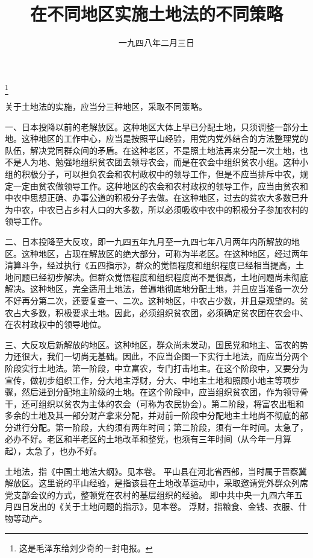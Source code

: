
\title{在不同地区实施土地法的不同策略}
\date{一九四八年二月三日}
\thanks{这是毛泽东给刘少奇的一封电报。}
\maketitle


关于土地法的实施，应当分三种地区，采取不同策略。

一、日本投降以前的老解放区。这种地区大体上早已分配土地，只须调整一部分土地。这种地区的工作中心，应当是按照平山经验，用党内党外结合的方法整理党的队伍，解决党同群众间的矛盾。在这种老区，不是照土地法再来分配一次土地，也不是人为地、勉强地组织贫农团去领导农会，而是在农会中组织贫农小组。这种小组的积极分子，可以担负农会和农村政权中的领导工作，但是不应当排斥中农，规定一定由贫农做领导工作。这种地区的农会和农村政权的领导工作，应当由贫农和中农中思想正确、办事公道的积极分子去做。在这种地区，过去的贫农大多数已升为中农，中农已占乡村人口的大多数，所以必须吸收中农中的积极分子参加农村的领导工作。

二、日本投降至大反攻，即一九四五年九月至一九四七年八月两年内所解放的地区。这种地区，占现在解放区的绝大部分，可称为半老区。在这种地区，经过两年清算斗争，经过执行《五四指示》，群众的觉悟程度和组织程度已经相当提高，土地问题已经初步解决。但群众觉悟程度和组织程度尚不是很高，土地问题尚未彻底解决。这种地区，完全适用土地法，普遍地彻底地分配土地，并且应当准备一次分不好再分第二次，还要复查一、二次。这种地区，中农占少数，并且是观望的。贫农占大多数，积极要求土地。因此，必须组织贫农团，必须确定贫农团在农会中、在农村政权中的领导地位。

三、大反攻后新解放的地区。这种地区，群众尚未发动，国民党和地主、富农的势力还很大，我们一切尚无基础。因此，不应当企图一下实行土地法，而应当分两个阶段实行土地法。第一阶段，中立富农，专门打击地主。在这个阶段中，又要分为宣传，做初步组织工作，分大地主浮财，分大、中地主土地和照顾小地主等项步骤，然后进到分配地主阶级的土地。在这个阶段中，应当组织贫农团，作为领导骨干，还可组织以贫农为主体的农会（可称为农民协会）。第二阶段，将富农出租和多余的土地及其一部分财产拿来分配，并对前一阶段中分配地主土地尚不彻底的部分进行分配。第一阶段，大约须有两年时间；第二阶段，须有一年时间。太急了，必办不好。老区和半老区的土地改革和整党，也须有三年时间（从今年一月算起），太急了，也办不好。


\begin{maonote}
土地法，指《中国土地法大纲》。见本卷。
平山县在河北省西部，当时属于晋察冀解放区。这里说的平山经验，是指该县在土地改革运动中，采取邀请党外群众列席党支部会议的方式，整顿党在农村的基层组织的经验。
即中共中央一九四六年五月四日发出的《关于土地问题的指示》，见本卷。
浮财，指粮食、金钱、衣服、什物等动产。
\end{maonote}
